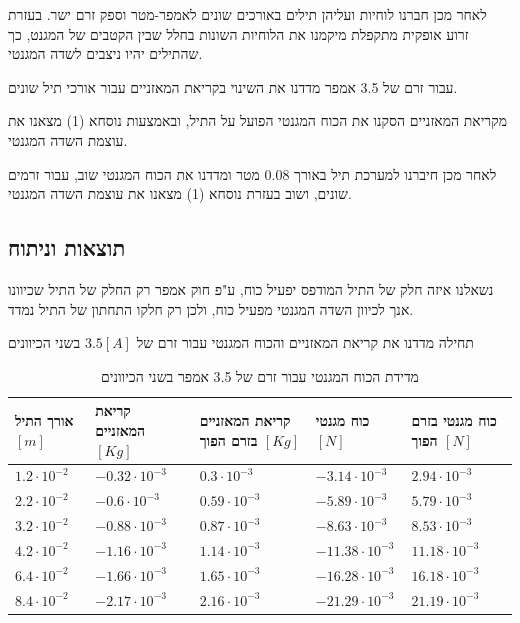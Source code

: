 \documentclass[14pt]{extarticle}
\begin{document}
לאחר מכן חברנו לוחיות ועליהן תילים באורכים שונים לאמפר-מטר וספק זרם ישר. בעזרת זרוע אופקית מתקפלת מיקמנו את הלוחיות השונות בחלל שבין הקטבים של המגנט, כך שהתילים יהיו ניצבים לשדה המגנטי.

עבור זרם של 3.5 אמפר מדדנו את השינוי בקריאת המאזניים עבור אורכי תיל שונים.

מקריאת המאזניים הסקנו את הכוח המגנטי הפועל על התיל, ובאמצעות נוסחא (1) מצאנו את עוצמת השדה המגנטי.

לאחר מכן חיברנו למערכת תיל באורך 0.08 מטר ומדדנו את הכוח המגנטי שוב, עבור זרמים שונים, ושוב בעזרת נוסחא (1) מצאנו את עוצמת השדה המגנטי.

\subsection*{תוצאות וניתוח}

נשאלנו איזה חלק של התיל המודפס יפעיל כוח, ע"פ חוק אמפר רק החלק של התיל שכיוונו אנך לכיוון השדה המגנטי מפעיל כוח, ולכן רק חלקו התחתון של התיל נמדד.

תחילה מדדנו את קריאת המאזניים והכוח המגנטי עבור זרם של $3.5 [A]$ בשני הכיוונים

\begin{table}[H]
    \centering
    \renewcommand{\arraystretch}{1.5} %
    \begin{tabular}{|p{2cm}|p{2.5cm}|p{2.5cm}|p{2.7cm}|p{2.7cm}|}
        \hline
        \textbf{אורך התיל} $[m]$ & \textbf{קריאת המאזניים} $[Kg]$ & \textbf{קריאת המאזניים בזרם הפוך} $[Kg]$ & \textbf{כוח מגנטי} $[N]$ & \textbf{כוח מגנטי בזרם הפוך} $[N]$ \\ \hline
        $1.2 \cdotp 10^{-2}$     & $-0.32 \cdotp 10^{-3}$         & $0.3 \cdotp 10^{-3}$                     & $-3.14 \cdotp 10^{-3}$   & $2.94 \cdotp 10^{-3}$              \\ \hline
        $2.2 \cdotp 10^{-2}$     & $-0.6 \cdotp 10^{-3}$          & $0.59 \cdotp 10^{-3}$                    & $-5.89 \cdotp 10^{-3}$   & $5.79 \cdotp 10^{-3}$              \\ \hline
        $3.2 \cdotp 10^{-2}$     & $-0.88 \cdotp 10^{-3}$         & $0.87 \cdotp 10^{-3}$                    & $-8.63 \cdotp 10^{-3}$   & $8.53 \cdotp 10^{-3}$              \\ \hline
        $4.2 \cdotp 10^{-2}$     & $-1.16 \cdotp 10^{-3}$         & $1.14 \cdotp 10^{-3}$                    & $-11.38 \cdotp 10^{-3}$  & $11.18 \cdotp 10^{-3}$             \\ \hline
        $6.4 \cdotp 10^{-2}$     & $-1.66 \cdotp 10^{-3}$         & $1.65 \cdotp 10^{-3}$                    & $-16.28 \cdotp 10^{-3}$  & $16.18 \cdotp 10^{-3}$             \\ \hline
        $8.4 \cdotp 10^{-2}$     & $-2.17 \cdotp 10^{-3}$         & $2.16 \cdotp 10^{-3}$                    & $-21.29 \cdotp 10^{-3}$  & $21.19 \cdotp 10^{-3}$             \\ \hline
    \end{tabular}
    \caption{מדידת הכוח המגנטי עבור זרם של 3.5 אמפר בשני הכיוונים}
    \label{tab:force_measurement}
\end{table}
\end{document}
